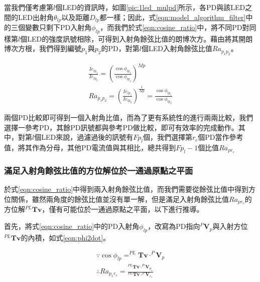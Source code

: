         當我們僅考慮第$l$個LED的資訊時，如圖\ref{pic:1led_mulpd}所示，各PD與該LED之間的LED出射角$\theta_{lp}$以及距離$D_{lp}$都一樣；因此，式\ref{eqn:model_algorithm_filter}中的三個變數只剩下PD入射角$\phi_{lp}$，而我們於式\ref{eqn:cosine_ratio}中，將不同PD對同樣第$l$個LED的強度訊號相除，可得到入射角餘弦比值的朗博次方。藉由將其開朗博次方根，我們得到編號$p_1$與$p_2$的PD，對第$l$個LED入射角餘弦比值$Ra_{p_1p_2}$。
    
        \begin{equation}
            \label{eqn:cosine_ratio}
            \begin{aligned}
                \frac{Ie_{lp_1}}{Ie_{lp_2}}={(\frac{\cos\phi_{lp_1}} {\cos\phi_{lp_2}})}^{Mp}\\
                Ra_{p_1p_2} = {( \frac{Ie_{lp_1}}{Ie_{lp_2}})} ^{\frac{1}{Mp}} = \frac{\cos\phi_{lp_1}}{\cos\phi_{lp_2}}
            \end{aligned}
        \end{equation}

        兩個PD比較即可得到一個入射角比值，而為了更有系統性的進行兩兩比較，我們選擇一參考PD，其餘PD訊號都與參考PD做比較，即可有效率的完成動作。其中，對第$l$個LED來說，過濾過後的訊號有$Fp_l$個，我們選擇第$r_c$個PD當作參考值，將其作為分母，其他PD電流值與其相比，總共得到$Fp_l-1$個比值$Ra_{pr_c}$

    \subsubsection{滿足入射角餘弦比值的方位解位於一通過原點之平面}
    \label{chp:solve_surface}
        
        於式\ref{eqn:cosine_ratio}中得到兩入射角餘弦比值，而我們需要從餘弦比值中得到方位關係，雖然兩角度的餘弦比值並沒有單一解，但是滿足入射角餘弦比值$Ra_{pr_c}$的方位解$^{PL}\boldsymbol{Tv}$，僅有可能位於一通過原點之平面，以下進行推導。
        
        首先，將式\ref{eqn:cosine_ratio}中的PD入射角$\phi_{lp}$，改寫為PD指向$^P\boldsymbol{V}_p$與入射方位$^{PL}\boldsymbol{Tv}$的內積，如式\ref{eqn:phi2dot}。
     

        \begin{equation}
            \label{eqn:phi2dot}
            \begin{aligned}
                \because \cos\phi_{lp} = ^{PL}\boldsymbol{Tv}\cdot^P\boldsymbol{V}_p\\
                \therefore Ra_{p_1r_c}
                =\frac{^{PL}\boldsymbol{Tv}\cdot^P\boldsymbol{V}_{p_1}}{^{PL}\boldsymbol{Tv}\cdot^P\boldsymbol{V}_{r_c}}
            \end{aligned}
        \end{equation}

